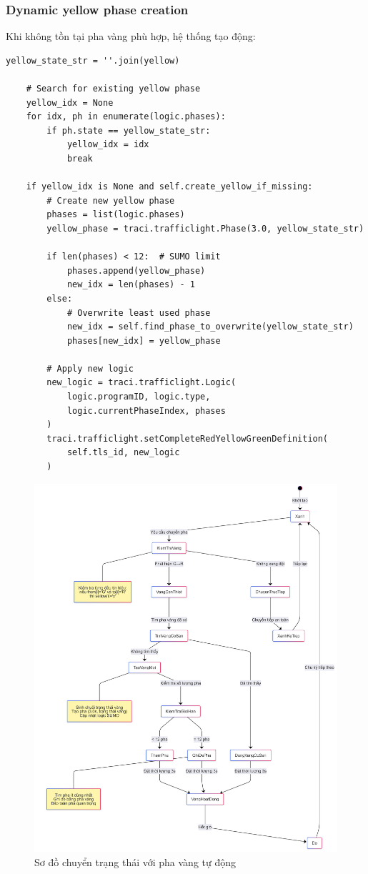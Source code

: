 \documentclass[12pt,a4paper,oneside]{report}
\begin{document}
\subsubsection{Dynamic yellow phase creation}

Khi không tồn tại pha vàng phù hợp, hệ thống tạo động:

\begin{lstlisting}[style=py, caption={Dynamic yellow phase creation}]
    yellow_state_str = ''.join(yellow)
    
    # Search for existing yellow phase
    yellow_idx = None
    for idx, ph in enumerate(logic.phases):
        if ph.state == yellow_state_str:
            yellow_idx = idx
            break
    
    if yellow_idx is None and self.create_yellow_if_missing:
        # Create new yellow phase
        phases = list(logic.phases)
        yellow_phase = traci.trafficlight.Phase(3.0, yellow_state_str)
        
        if len(phases) < 12:  # SUMO limit
            phases.append(yellow_phase)
            new_idx = len(phases) - 1
        else:
            # Overwrite least used phase
            new_idx = self.find_phase_to_overwrite(yellow_state_str)
            phases[new_idx] = yellow_phase
            
        # Apply new logic
        new_logic = traci.trafficlight.Logic(
            logic.programID, logic.type, 
            logic.currentPhaseIndex, phases
        )
        traci.trafficlight.setCompleteRedYellowGreenDefinition(
            self.tls_id, new_logic
        )
\end{lstlisting}

\begin{figure}[H]
    \centering
    \includegraphics[width=0.75\linewidth]{Untitled diagram _ Mermaid Chart-2025-08-22-070255.png}
    \caption{Sơ đồ chuyển trạng thái với pha vàng tự động}
    \label{fig:placeholder}
\end{figure}
\end{document}
